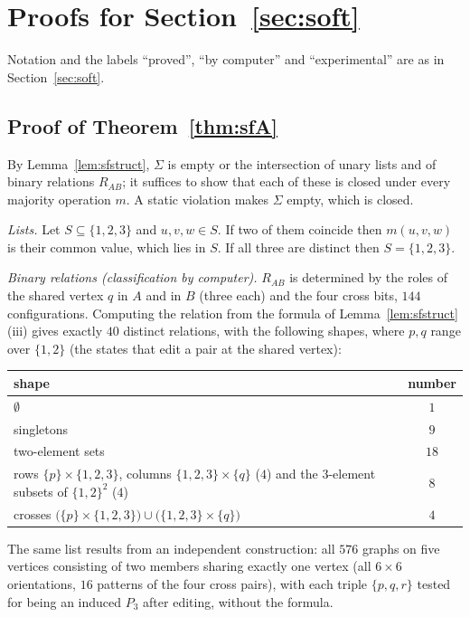 \section{Proofs for Section~\ref{sec:soft}}\label{app:soft}
Notation and the labels ``proved'', ``by computer'' and ``experimental'' are as in Section~\ref{sec:soft}.

\subsection{Proof of Theorem~\ref{thm:sfA}}\label{app:softA}
By Lemma~\ref{lem:sfstruct}, $\Sigma$ is empty or the intersection of unary lists and of binary relations $R_{AB}$; it suffices to show that each of these is closed under every majority operation $m$. A static violation makes $\Sigma$ empty, which is closed.

\emph{Lists.} Let $S\subseteq\{1,2,3\}$ and $u,v,w\in S$. If two of them coincide then $m(u,v,w)$ is their common value, which lies in $S$. If all three are distinct then $S=\{1,2,3\}$.

\emph{Binary relations (classification by computer).} $R_{AB}$ is determined by the roles of the shared vertex $q$ in $A$ and in $B$ (three each) and the four cross bits, $144$ configurations. Computing the relation from the formula of Lemma~\ref{lem:sfstruct}(iii) gives exactly $40$ distinct relations, with the following shapes, where $p,q$ range over $\{1,2\}$ (the states that edit a pair at the shared vertex):
\begin{center}
\begin{tabular}{@{}lc@{}}
shape & number\\\hline
$\emptyset$ & $1$\\
singletons & $9$\\
two-element sets & $18$\\
rows $\{p\}\times\{1,2,3\}$, columns $\{1,2,3\}\times\{q\}$ ($4$) and the $3$-element subsets of $\{1,2\}^2$ ($4$) & $8$\\
crosses $\bigl(\{p\}\times\{1,2,3\}\bigr)\cup\bigl(\{1,2,3\}\times\{q\}\bigr)$ & $4$
\end{tabular}
\end{center}
The same list results from an independent construction: all $576$ graphs on five vertices consisting of two members sharing exactly one vertex (all $6\times6$ orientations, $16$ patterns of the four cross pairs), with each triple $\{p,q,r\}$ tested for being an induced $P_3$ after editing, without the formula.

